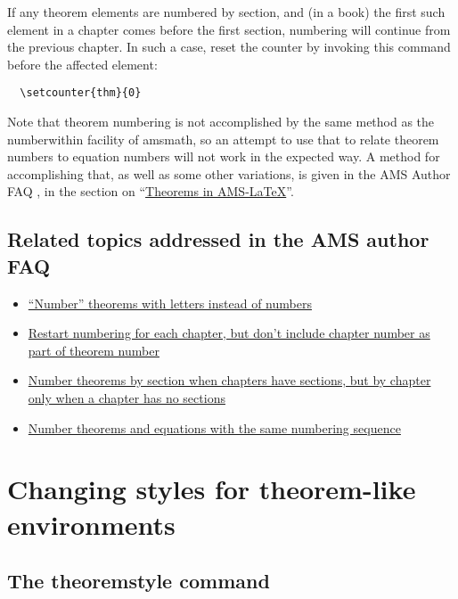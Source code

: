 \documentclass[11pt,twoside]{article}
\providecommand{\qq}[1]{\textquotedblleft#1\textquotedblright}
\newcommand{\ntt}{%
  \fontfamily\ttdefault \fontseries\mddefault \fontshape\updefault
  \selectfont
}
\DeclareRobustCommand{\cn}[1]{{\ntt\bslchar#1}}
\DeclareRobustCommand{\pkg}[1]{{\ntt#1}}
\begin{document}
If any theorem elements are numbered by section, and (in a book) the
first such element in a chapter comes before the first section,
numbering will continue from the previous chapter.  In such a case,
reset the counter by invoking this command before the affected element:
\begin{verbatim}
  \setcounter{thm}{0}
\end{verbatim}

Note that theorem numbering is not accomplished by the same method
as the \cn{numberwithin} facility of \pkg{amsmath}, so an attempt to
use that to relate theorem numbers to equation numbers will not work
in the expected way.  A method for accomplishing that, as well as
some other variations, is given in the AMS Author FAQ \cite{AF},
in the section on
\qq{\href{http://www.ams.org//faq?class_id=561}{Theorems in AMS-\LaTeX}}.

\newpage %

\subsection{Related topics addressed in the AMS author FAQ}

\begin{itemize}
\item \href{http://www.ams.org/faq?faq_id=199}{``Number''
  theorems with letters instead of numbers}

\item \href{http://www.ams.org/faq?faq_id=200}{Restart numbering for each
  chapter, but don't include chapter number as part of theorem number}
 
\item \href{http://www.ams.org/faq?faq_id=202}{Number theorems by
  section when chapters have sections, but by chapter only when a chapter
  has no sections}

\item \href{http://www.ams.org/faq?faq_id=289}{Number theorems and
  equations with the same numbering sequence}
\end{itemize}


\section{Changing styles for theorem-like environments}

\subsection{The \texorpdfstring{\cn{theoremstyle}}{theoremstyle} command}
\end{document}
